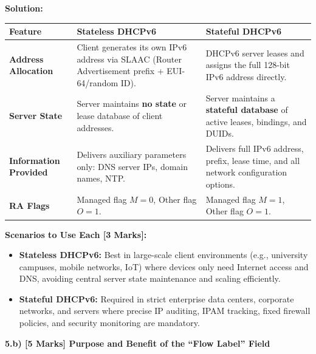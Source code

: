 \documentclass[11pt,a4paper]{article}
\begin{document}
\textbf{Solution:}
\begin{center}
\begin{tabular}{|p{3cm}|p{6.5cm}|p{6.5cm}|}
\hline
\textbf{Feature} & \textbf{Stateless DHCPv6} & \textbf{Stateful DHCPv6} \\
\hline
\textbf{Address Allocation} & Client generates its own IPv6 address via SLAAC (Router Advertisement prefix + EUI-64/random ID). & DHCPv6 server leases and assigns the full 128-bit IPv6 address directly. \\
\hline
\textbf{Server State} & Server maintains \textbf{no state} or lease database of client addresses. & Server maintains a \textbf{stateful database} of active leases, bindings, and DUIDs. \\
\hline
\textbf{Information Provided} & Delivers auxiliary parameters only: DNS server IPs, domain names, NTP. & Delivers full IPv6 address, prefix, lease time, and all network configuration options. \\
\hline
\textbf{RA Flags} & Managed flag $M = 0$, Other flag $O = 1$. & Managed flag $M = 1$, Other flag $O = 1$. \\
\hline
\end{tabular}
\end{center}

\textbf{Scenarios to Use Each [3 Marks]:}
\begin{itemize}
    \item \textbf{Stateless DHCPv6:} Best in large-scale client environments (e.g., university campuses, mobile networks, IoT) where devices only need Internet access and DNS, avoiding central server state maintenance and scaling efficiently.
    \item \textbf{Stateful DHCPv6:} Required in strict enterprise data centers, corporate networks, and servers where precise IP auditing, IPAM tracking, fixed firewall policies, and security monitoring are mandatory.
\end{itemize}

\vspace{0.2cm}
\textbf{5.b) [5 Marks] Purpose and Benefit of the ``Flow Label'' Field}
\end{document}
